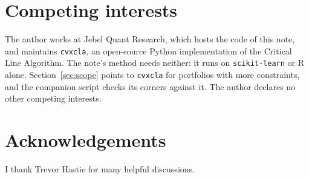 \documentclass[11pt]{article}
\begin{document}
\section*{Competing interests}

The author works at Jebel Quant Research, which hosts the code of this note, and
maintains \texttt{cvxcla}, an open-source Python implementation of the Critical Line
Algorithm. The note's method needs neither: it runs on \texttt{scikit-learn} or R alone.
Section~\ref{sec:scope} points to \texttt{cvxcla} for portfolios with more constraints,
and the companion script checks its corners against it.
The author declares no other competing interests.

\section*{Acknowledgements}

I thank Trevor Hastie for many helpful discussions.
\end{document}
